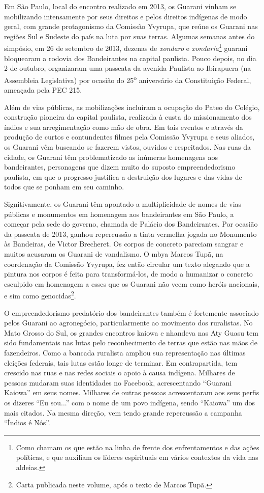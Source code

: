 Em São Paulo, local do encontro realizado em 2013, os Guarani vinham se
mobilizando intensamente por seus direitos e pelos direitos indígenas de
modo geral, com grande protagonismo da Comissão Yvyrupa, que reúne os
Guarani nas regiões Sul e Sudeste do país na luta por suas terras.
Algumas semanas antes do simpósio, em 26 de setembro de 2013, dezenas de
\emph{xondaro} e \emph{xondaria}\footnote{Como chamam os que estão na
  linha de frente dos enfrentamentos e das ações políticas, e que
  auxiliam os líderes espirituais em vários contextos da vida nas
  aldeias.} guarani bloquearam a rodovia dos Bandeirantes na capital
paulista. Pouco depois, no dia 2 de outubro, organizaram uma passeata da
avenida Paulista ao Ibirapuera (na Assembleia Legislativa) por ocasião
do 25\textsuperscript{o} aniversário da Constituição Federal, ameaçada
pela PEC 215.

Além de vias públicas, as mobilizações incluíram a ocupação do Pateo do
Colégio, construção pioneira da capital paulista, realizada à custa do
missionamento dos índios e sua arregimentação como mão de obra. Em tais
eventos e através da produção de curtos e contundentes filmes pela
Comissão Yvyrupa e seus aliados, os Guarani vêm buscando se fazerem
vistos, ouvidos e respeitados. Nas ruas da cidade, os Guarani têm
problematizado as inúmeras homenagens aos bandeirantes, personagens que
dizem muito do suposto empreendedorismo paulista, em que o progresso
justifica a destruição dos lugares e das vidas de todos que se ponham em
seu caminho.

Signitivamente, os Guarani têm apontado a multiplicidade de nomes de
vias públicas e monumentos em homenagem aos bandeirantes em São Paulo, a
começar pela sede do governo, chamada de Palácio dos Bandeirantes. Por
ocasião da passeata de 2013, ganhou repercussão a tinta vermelha jogada
no Monumento às Bandeiras, de Victor Brecheret. Os corpos de concreto
pareciam sangrar e muitos acusaram os Guarani de vandalismo. O mbya
Marcos Tupã, na coordenação da Comissão Yvyrupa, fez então circular um
texto alegando que a pintura nos corpos é feita para transformá-los, de
modo a humanizar o concreto esculpido em homenagem a esses que os
Guarani não veem como heróis nacionais, e sim como genocidas\footnote{Carta
  publicada neste volume, após o texto de Marcos Tupã.}.

O empreendedorismo predatório dos bandeirantes também é fortemente
associado pelos Guarani ao agronegócio, particularmente ao movimento dos
ruralistas. No Mato Grosso do Sul, os grandes encontros kaiowa e
nhandeva nas Aty Guasu tem sido fundamentais nas lutas pelo
reconhecimento de terras que estão nas mãos de fazendeiros. Como a
bancada ruralista ampliou sua representação nas últimas eleições
federais, tais lutas estão longe de terminar. Em contrapartida, tem
crescido nas ruas e nas redes sociais o apoio à causa indígena. Milhares
de pessoas mudaram suas identidades no Facebook, acrescentando ``Guarani
Kaiowa'' em seus nomes. Milhares de outras pessoas acrescentaram aos
seus perfis os dizeres ``Eu sou...'' com o nome de um povo indígena,
sendo ``Kaiowa'' um dos mais citados. Na mesma direção, vem tendo grande
repercussão a campanha ``Índios é Nós''.

